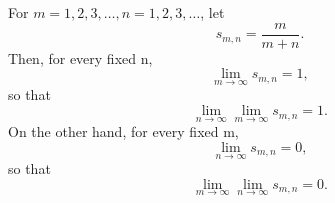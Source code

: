 %
%

\begin{example} %
  \label{ex:chap7:double_sequence}
  For $m=1, 2, 3, \dots, n=1, 2, 3, \dots$, let
  \[ s_{m,n} = \frac{m}{m+n}. \]
  Then, for every fixed n,
  \[ \lim_{m \to \infty} s_{m,n} = 1, \]
  so that
  \begin{equation} \label{eq:chap7:double_seq_lim1}
    \lim_{n \to \infty} \lim_{m \to \infty} s_{m,n} = 1.
  \end{equation}
  On the other hand, for every fixed m,
  \[ \lim_{n \to \infty} s_{m,n} = 0, \]
  so that
  \begin{equation} \label{eq:chap7:double_seq_lim2}
    \lim_{m \to \infty} \lim_{n \to \infty} s_{m,n} = 0.
  \end{equation}
\end{example}


